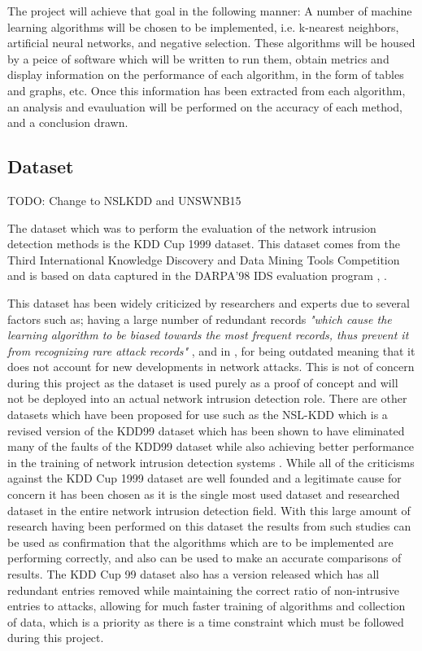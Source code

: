 	The project will achieve that goal in the following manner: A number of machine learning algorithms will be chosen to be implemented, i.e. k-nearest neighbors, artificial neural networks, and negative selection. These algorithms will be housed by a peice of software which will be written to run them, obtain metrics and display information on the performance of each algorithm, in the form of tables and graphs, etc. Once this information has been extracted from each algorithm, an analysis and evauluation will be performed on the accuracy of each method, and a conclusion drawn.
		
	\subsection{Dataset}
	TODO: Change to NSLKDD and UNSWNB15

	The dataset which was to perform the evaluation of the network intrusion detection methods is the KDD Cup 1999 dataset. This dataset comes from the Third International Knowledge Discovery and Data Mining Tools Competition and is based on data captured in the DARPA'98 IDS evaluation program \cite{Lippmann2000darpa}, \cite{tavallaee2009detailed}. 
	
	This dataset has been widely criticized by researchers and experts due to several factors such as; having a large number of redundant records \textit{"which  cause  the  learning  algorithm  to  be  biased  towards  the  most  frequent  records,  thus  prevent  it  from  recognizing  rare  attack  records"} \cite{panda2012hybrid} , and in \cite{vasudevan2011ssenet}, for being outdated meaning that it does not account for new developments in network attacks. This is not of concern during this project as the dataset is used purely as a proof of concept and will not be deployed into an actual network intrusion detection role. There are other datasets which have been proposed for use such as the NSL-KDD which is a revised version of the KDD99 dataset which has been shown to have eliminated many of the faults of the KDD99 dataset while also achieving better performance in the training of network intrusion detection systems \cite{dhanabal2015study}. While all of the criticisms against the KDD Cup 1999 dataset are well founded and a legitimate cause for concern it has been chosen as it is the single most used dataset and researched dataset in the entire network intrusion detection field. With this large amount of research having been performed on this dataset the results from such studies can be used as confirmation that the algorithms which are to be implemented are performing correctly, and also can be used to make an accurate comparisons of results. The KDD Cup 99 dataset also has a version released which has all redundant entries removed while maintaining the correct ratio of non-intrusive entries to attacks, allowing for much faster training of algorithms and collection of data, which is a priority as there is a time constraint which must be followed during this project.
	
